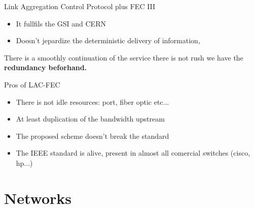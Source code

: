 \documentclass[compress,red]{beamer}
\begin{document}
\begin{frame}{Link Aggregation Control Protocol plus FEC III}

\begin{itemize}
    \item It fullfils the GSI and CERN 
    \item Doesn't jepardize the deterministic delivery of information, 
\end{itemize}

There is a smoothly continuation of the service there is not rush we have the \textbf{redundancy beforhand.}

Pros of LAC-FEC

\begin{itemize}
    \item There is not idle resources: port, fiber optic etc...
    \item At least duplication of the bandwidth upstream 
    \item The proposed scheme doesn't break the standard
    \item The IEEE standard is alive, present in almost all comercial switches (cisco, hp...)
\end{itemize}

\end{frame}


\section{Networks}
\end{document}
